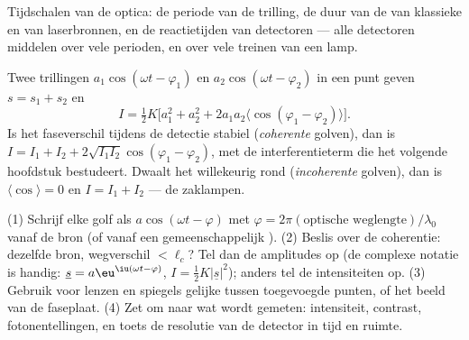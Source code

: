 \begin{omfigure}

{\small Tijdschalen van de optica: de periode van de trilling, de duur van
de  van klassieke en van laserbronnen, en de reactietijden van
detectoren --- alle detectoren middelen over vele perioden, en over vele
treinen van een lamp.}
\end{omfigure}

\begin{remark}\label{rem:b2:scalar-light-model:superposition}
Twee trillingen $a_1\cos(\omega t - \varphi_1)$ en
$a_2\cos(\omega t - \varphi_2)$ in een punt geven $s = s_1 + s_2$ en
\[
I = \tfrac12K\bigl[a_1^2 + a_2^2 + 2a_1a_2\langle\cos(\varphi_1 - \varphi_2)\rangle\bigr] .
\]
Is het faseverschil tijdens de detectie stabiel (\emph{coherente} golven),
dan is $I = I_1 + I_2 + 2\sqrt{I_1I_2}\cos(\varphi_1 - \varphi_2)$, met de
interferentieterm die het volgende hoofdstuk bestudeert. Dwaalt het
willekeurig rond (\emph{incoherente} golven), dan is
$\langle\cos\rangle = 0$ en $I = I_1 +
I_2$ --- de zaklampen.
\end{remark}

\begin{method}\label{met:b2:scalar-light-model:method}
(1) Schrijf elke golf als $a\cos(\omega t - \varphi)$ met
$\varphi = 2\pi(\text{optische weglengte})/\lambda_0$ vanaf de bron (of
vanaf een gemeenschappelijk ). (2) Beslis over de coherentie:
dezelfde bron, wegverschil $< \ell_c$? Tel dan de amplitudes op (de complexe
notatie is handig: $\underline s = a\eu^{\iu(\omega t - \varphi)}$,
$I =
\tfrac12K|\underline s|^2$); anders tel de intensiteiten op. (3)
Gebruik voor lenzen en spiegels gelijke  tussen
toegevoegde punten, of het beeld van de faseplaat. (4) Zet om naar wat wordt
gemeten: intensiteit, contrast, fotonentellingen, en toets de resolutie van
de detector in tijd en ruimte.
\end{method}

